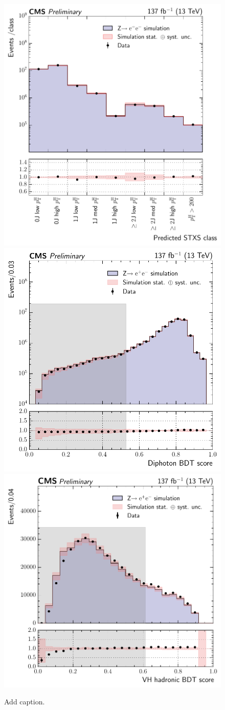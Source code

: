 \begin{figure}[hptb]
  \centering
  \includegraphics[width=.55\textwidth]{Figures/hgg_overview/ggH_BDT_validation.pdf}
  \includegraphics[width=.47\textwidth]{Figures/hgg_overview/DiphotonBDT_validation.pdf}
  \includegraphics[width=.49\textwidth]{Figures/hgg_overview/VHHadronicBDT_validation.pdf}
  \caption[Validation of the event categorisation classifiers]
  {
    Add caption.
  }
  \label{fig:categorisation_validation}
\end{figure}

\FloatBarrier
\newpage

